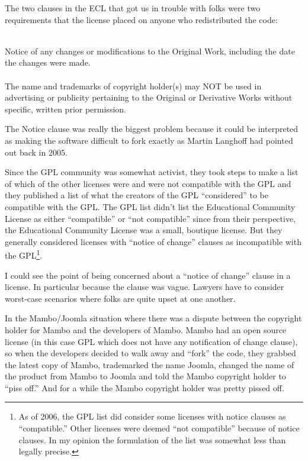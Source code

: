 \documentclass[12pt]{book}
\begin{document}
The two clauses in the ECL that got us in trouble
with folks were two requirements that the license
placed on anyone who redistributed the code:\\
\\
\begin{sf}
Notice of any changes or modifications to the
Original Work, including the date the changes were made.\\
\\
The name and trademarks of copyright holder(s) may
NOT be used in advertising or publicity pertaining
to the Original or Derivative Works without specific,
written prior permission.\\
\end{sf}

The Notice clause was really the biggest problem
because it could be interpreted as making the
software difficult to fork exactly as Martin
Langhoff had pointed out back in 2005.

Since the GPL community was somewhat activist,
they took steps to make a list of which of the
other licenses were and were not compatible with
the GPL and they published a list of what the
creators of the GPL ``considered'' to be compatible
with the GPL.  The GPL list didn't list the
Educational Community License as either ``compatible''
or ``not compatible'' since from their perspective,
the Educational Community License was a small,
boutique license.  But they generally considered
licenses with ``notice of change'' clauses
as incompatible with the GPL\footnote{As of 2006,
the GPL list did consider some licenses with
notice clauses as ``compatible.''  Other licenses
were deemed ``not compatible'' because of
notice clauses.  In my opinion the formulation of the list was
somewhat less than legally precise.}.

I could see the point of being concerned
about a ``notice of change'' clause in a license.
In particular because the clause was vague.
Lawyers have to consider worst-case scenarios
where folks are quite upset at one another.

In the Mambo\slash Joomla situation where there was a
dispute between the copyright holder for Mambo
and the developers of Mambo.  Mambo had an open
source license (in this case GPL which does not
have any notification of change clause), so when
the developers decided to walk away and ``fork''
the code, they grabbed the latest copy of Mambo,
trademarked the name Joomla, changed the name of
the product from Mambo to Joomla and told the
Mambo copyright holder to ``piss off.''  And
for a while the Mambo copyright holder was pretty
pissed off.
\end{document}
